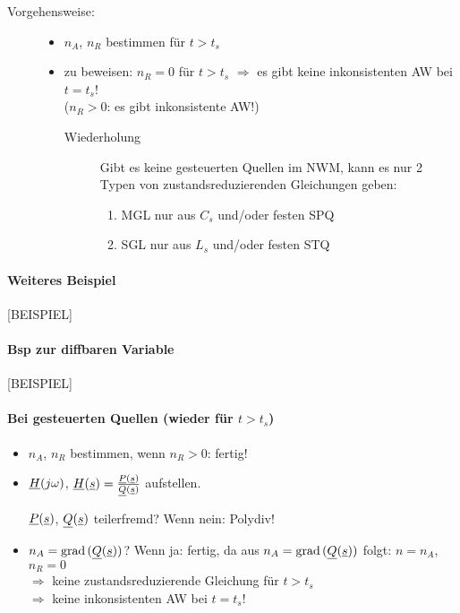 \begin{description}
  \item[Vorgehensweise:]\hfill
    \begin{itemize}
      \item $n_A$, $n_R$ bestimmen für $t>t_s$
      \item zu beweisen: $n_R=0$ für $t>t_s$
        $\Rightarrow$ es gibt keine inkonsistenten AW bei $t=t_s$!\\
        ($n_R>0$: es gibt inkonsistente AW!)
        
      \begin{description}
        \item[Wiederholung]
          Gibt es keine gesteuerten Quellen im NWM, kann es nur 2 Typen von 
          zustandsreduzierenden Gleichungen geben:
          \begin{enumerate}
            \item MGL nur aus $C_s$ und/oder festen SPQ
            \item SGL nur aus $L_s$ und/oder festen STQ
          \end{enumerate}
      \end{description}
    \end{itemize}
\end{description}


\paragraph{Weiteres Beispiel}

[BEISPIEL]%

\paragraph{Bsp zur diffbaren Variable}

[BEISPIEL]%

\paragraph{Bei gesteuerten Quellen (wieder für $t>t_s$)}

\begin{itemize}
  \item $n_A$, $n_R$ bestimmen, wenn $n_R>0$: fertig!
  \item $\underline{H}(j\omega)$,
    $\underline{H}(\underline{s}) = \frac{\underline{P}(\underline{s})}{\underline{Q}(\underline{s})}$ aufstellen.\medskip
    
    $\underline{P}(\underline{s})$, $\underline{Q}(\underline{s})$ teilerfremd? Wenn nein: Polydiv!
  \item $n_A = \operatorname{grad}{(\underline{Q}(\underline{s}))}$? Wenn ja: fertig, da aus
    $n_A  = \operatorname{grad}{(\underline{Q}(\underline{s}))}$ folgt: $n=n_A$, $n_R=0$\\
    $\Rightarrow$ keine zustandsreduzierende Gleichung für $t>t_s$\\
    $\Rightarrow$ keine inkonsistenten AW bei $t=t_s$!
\end{itemize}


